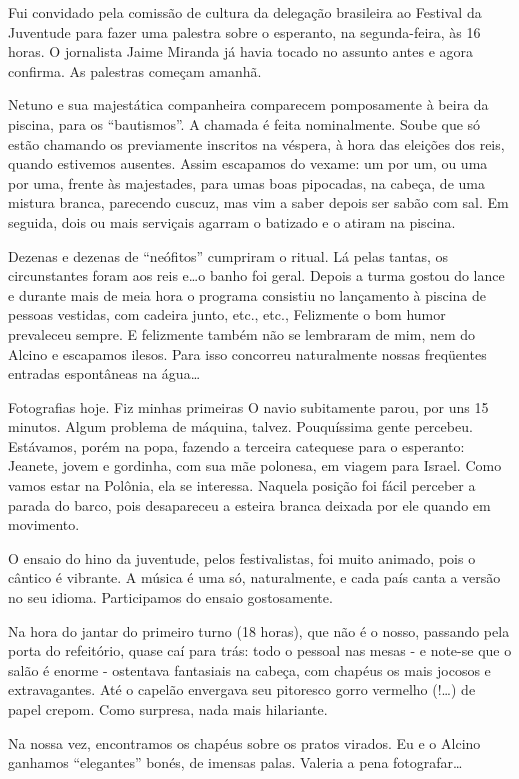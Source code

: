 Fui convidado pela comissão de cultura da delegação brasileira ao Festival da Juventude para fazer uma palestra sobre o esperanto, na segunda-feira, às 16 horas. O jornalista Jaime Miranda já havia tocado no assunto antes e agora confirma. As palestras começam amanhã.

Netuno e sua majestática companheira comparecem pomposamente à beira da piscina, para os “bautismos”. A chamada é feita nominalmente. Soube que só estão chamando os previamente inscritos na véspera, à hora das eleições dos reis, quando estivemos ausentes. Assim escapamos do vexame: um por um, ou uma por uma, frente às majestades, para umas boas pipocadas, na cabeça, de uma mistura branca, parecendo cuscuz, mas vim a saber depois ser sabão com sal. Em seguida, dois ou mais serviçais agarram o batizado e o atiram na piscina.

Dezenas e dezenas de “neófitos” cumpriram o ritual. Lá pelas tantas, os circunstantes foram aos reis e\ldots o banho foi geral. Depois a turma gostou do lance e durante mais de meia hora o programa consistiu no lançamento à piscina de pessoas vestidas, com cadeira junto, etc., etc., Felizmente o bom humor prevaleceu sempre. E felizmente também não se lembraram de mim, nem do Alcino e escapamos ilesos. Para isso concorreu naturalmente nossas freqüentes entradas espontâneas na água\ldots

Fotografias hoje. Fiz minhas primeiras O navio subitamente parou, por uns 15 minutos. Algum problema de máquina, talvez. Pouquíssima gente percebeu. Estávamos, porém na popa, fazendo a terceira catequese para o esperanto: Jeanete, jovem e gordinha, com sua mãe polonesa, em viagem para Israel. Como vamos estar na Polônia, ela se interessa. Naquela posição foi fácil perceber a parada do barco, pois desapareceu a esteira branca deixada por ele quando em movimento.

O ensaio do hino da juventude, pelos festivalistas, foi muito animado, pois o cântico é vibrante. A música é uma só, naturalmente, e cada país canta a versão no seu idioma. Participamos do ensaio gostosamente.

Na hora do jantar do primeiro turno (18 horas), que não é o nosso, passando pela porta do refeitório, quase caí para trás: todo o pessoal nas mesas - e note-se que o salão é enorme - ostentava fantasiais na cabeça, com chapéus os mais jocosos e extravagantes. Até o capelão envergava seu pitoresco gorro vermelho (!\ldots) de papel crepom. Como surpresa, nada mais hilariante.

Na nossa vez, encontramos os chapéus sobre os pratos virados. Eu e o Alcino ganhamos “elegantes” bonés, de imensas palas. Valeria a pena fotografar\ldots


